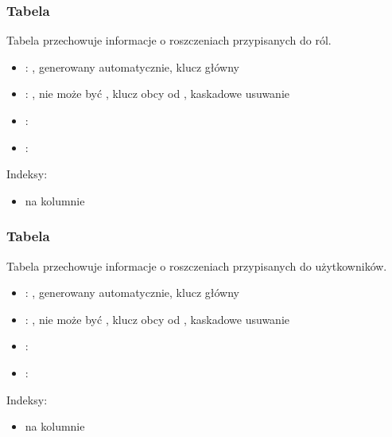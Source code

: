 \subsubsection{Tabela }
Tabela przechowuje informacje o roszczeniach przypisanych do ról.
\begin{itemize}
    \item {}: , generowany automatycznie, klucz główny
    \item {}: , nie może być , klucz obcy od , kaskadowe usuwanie
    \item {}: 
    \item {}: 
\end{itemize}
Indeksy:
\begin{itemize}
    \item {} na kolumnie 
\end{itemize}

\subsubsection{Tabela }
Tabela przechowuje informacje o roszczeniach przypisanych do użytkowników.
\begin{itemize}
    \item {}: , generowany automatycznie, klucz główny
    \item {}: , nie może być , klucz obcy od , kaskadowe usuwanie
    \item {}: 
    \item {}: 
\end{itemize}
Indeksy:
\begin{itemize}
    \item {} na kolumnie 
\end{itemize}

